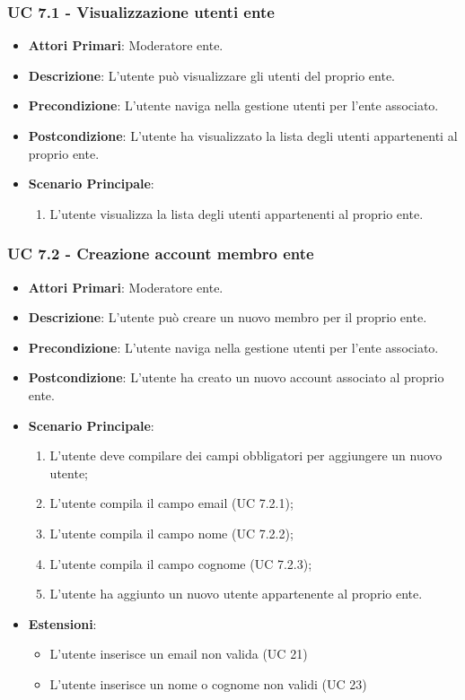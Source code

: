 			\subsubsection{UC 7.1 - Visualizzazione utenti ente}
			\begin{itemize}
				\item \textbf{Attori Primari}: Moderatore ente.
				\item \textbf{Descrizione}: L'utente può visualizzare gli utenti del proprio ente.
				\item \textbf{Precondizione}: L'utente naviga nella gestione utenti per l'ente associato.
				\item \textbf{Postcondizione}: L'utente ha visualizzato la lista degli utenti appartenenti al proprio ente.
				\item \textbf{Scenario Principale}:
				\begin{enumerate}
					\item{L'utente visualizza la lista degli utenti appartenenti al proprio ente.}
				\end{enumerate}	
			\end{itemize}
			
			\subsubsection{UC 7.2 - Creazione account membro ente}
			\begin{itemize}
				\item \textbf{Attori Primari}: Moderatore ente.
				\item \textbf{Descrizione}: L'utente può creare un nuovo membro per il proprio ente.
				\item \textbf{Precondizione}: L'utente naviga nella gestione utenti per l'ente associato.
				\item \textbf{Postcondizione}: L'utente ha creato un nuovo account associato al proprio ente.
				\item \textbf{Scenario Principale}:
				\begin{enumerate}
					\item{L'utente deve compilare dei campi obbligatori per aggiungere un nuovo utente;}
					\item{L'utente compila il campo email (UC 7.2.1);}
					\item{L'utente compila il campo nome (UC 7.2.2);}
					\item{L'utente compila il campo cognome (UC 7.2.3);}
					\item{L'utente ha aggiunto un nuovo utente appartenente al proprio ente.}
				\end{enumerate}	
				\item \textbf{Estensioni}:
				\begin{itemize}
					\item L'utente inserisce un email non valida (UC 21)
					\item L'utente inserisce un nome o cognome non validi (UC 23)
				\end{itemize}
			\end{itemize}
			
